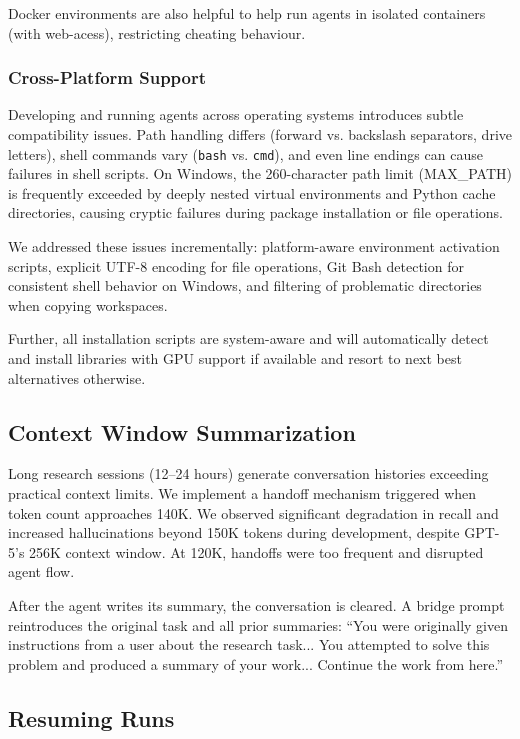 \documentclass[11pt]{article}
\let\oldtexttt\texttt
\renewcommand{\texttt}[1]{{\fontseries{m}\selectfont\oldtexttt{#1}}}
\theoremstyle{plain}
\theoremstyle{definition}
\theoremstyle{remark}
\begin{document}
Docker environments are also helpful to help run agents in isolated containers (with web-acess), restricting cheating behaviour.

\subsubsection{Cross-Platform Support} \label{app:cross-platform}

Developing and running agents across operating systems introduces subtle compatibility issues. Path handling differs (forward vs. backslash separators, drive letters), shell commands vary (\texttt{bash} vs. \texttt{cmd}), and even line endings can cause failures in shell scripts. On Windows, the 260-character path limit (MAX\_PATH) is frequently exceeded by deeply nested virtual environments and Python cache directories, causing cryptic failures during package installation or file operations.

We addressed these issues incrementally: platform-aware environment activation scripts, explicit UTF-8 encoding for file operations, Git Bash detection for consistent shell behavior on Windows, and filtering of problematic directories when copying workspaces. 

Further, all installation scripts are system-aware and will automatically detect and install libraries with GPU support if available and resort to next best alternatives otherwise. 

\subsection{Context Window Summarization} \label{app:context-window-summarization}

Long research sessions (12--24 hours) generate conversation histories exceeding practical context limits. We implement a handoff mechanism triggered when token count approaches 140K. We observed significant degradation in recall and increased hallucinations beyond 150K tokens during development, despite GPT-5's 256K context window. At 120K, handoffs were too frequent and disrupted agent flow. 

After the agent writes its summary, the conversation is cleared. A bridge prompt reintroduces the original task and all prior summaries: ``You were originally given instructions from a user about the research task... You attempted to solve this problem and produced a summary of your work... Continue the work from here.'' 


\subsection{Resuming Runs} \label{app:resuming}
\end{document}
